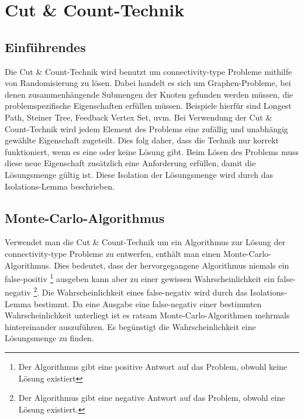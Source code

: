 %
%
%
\chapter{Cut \& Count-Technik}
\label{c:cc_general} %


\section{Einführendes}
\label{sec:1}
Die Cut \& Count-Technik wird benutzt um connectivity-type Probleme mithilfe von Randomisierung zu lösen. Dabei handelt es sich um Graphen-Probleme, bei denen zusammenhängende Submengen der Knoten gefunden werden müssen, die problemspezifische  Eigenschaften erfüllen müssen. Beispiele hierfür sind Longest Path, Steiner Tree, Feedback Vertex Set, uvm.
Bei Verwendung der Cut \& Count-Technik wird jedem Element des Problems eine zufällig und unabhängig gewählte Eigenschaft zugeteilt. Dies folg daher, dass die Technik nur korrekt funktioniert, wenn es eine oder keine Lösung gibt. Beim Lösen des Problems muss diese neue Eigenschaft zusätzlich eine Anforderung erfüllen, damit die Lösungsmenge gültig ist. Diese Isolation der Lösungsmenge wird durch das Isolations-Lemma beschrieben.

\section{Monte-Carlo-Algorithmus}
\label{sec:2}

Verwendet man die Cut \& Count-Technik um ein Algorithmus zur Lösung der connectivity-type Probleme zu entwerfen, enthält man einen Monte-Carlo-Algorithmus. Dies bedeutet, dass der hervorgegangene Algorithmus niemals ein false-positiv \footnote{Der Algorithmus gibt eine positive Antwort auf das Problem, obwohl keine Lösung existiert} ausgeben kann aber zu einer gewissen Wahrscheinlichkeit ein false-negativ \footnote{Der Algorithmus gibt eine negative Antwort auf das Problem, obwohl eine Lösung existiert.}. Die Wahrscheinlichkeit eines false-negativ wird durch das Isolations-Lemma bestimmt. Da eine Ausgabe eine false-negativ einer bestimmten Wahrscheinlichkeit unterliegt ist es ratsam Monte-Carlo-Algorithmen mehrmals hintereinander auszuführen. Es begünstigt die Wahrscheinlichkeit eine Lösungsmenge zu finden.

